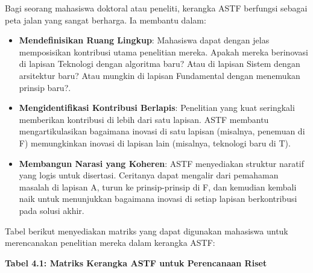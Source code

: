 \documentclass[
  letterpaper,
  DIV=11,
  numbers=noendperiod]{scrreprt}
\providecommand{\tightlist}{%
  \setlength{\itemsep}{0pt}\setlength{\parskip}{0pt}}
\begin{document}
Bagi seorang mahasiswa doktoral atau peneliti, kerangka ASTF berfungsi
sebagai peta jalan yang sangat berharga. Ia membantu dalam:

\begin{itemize}
\tightlist
\item
  \textbf{Mendefinisikan Ruang Lingkup}: Mahasiswa dapat dengan jelas
  memposisikan kontribusi utama penelitian mereka. Apakah mereka
  berinovasi di lapisan Teknologi dengan algoritma baru? Atau di lapisan
  Sistem dengan arsitektur baru? Atau mungkin di lapisan Fundamental
  dengan menemukan prinsip baru?.
\item
  \textbf{Mengidentifikasi Kontribusi Berlapis}: Penelitian yang kuat
  seringkali memberikan kontribusi di lebih dari satu lapisan. ASTF
  membantu mengartikulasikan bagaimana inovasi di satu lapisan
  (misalnya, penemuan di F) memungkinkan inovasi di lapisan lain
  (misalnya, teknologi baru di T).
\item
  \textbf{Membangun Narasi yang Koheren}: ASTF menyediakan struktur
  naratif yang logis untuk disertasi. Ceritanya dapat mengalir dari
  pemahaman masalah di lapisan A, turun ke prinsip-prinsip di F, dan
  kemudian kembali naik untuk menunjukkan bagaimana inovasi di setiap
  lapisan berkontribusi pada solusi akhir.
\end{itemize}

Tabel berikut menyediakan matriks yang dapat digunakan mahasiswa untuk
merencanakan penelitian mereka dalam kerangka ASTF:

\textbf{Tabel 4.1: Matriks Kerangka ASTF untuk Perencanaan Riset}
\end{document}
